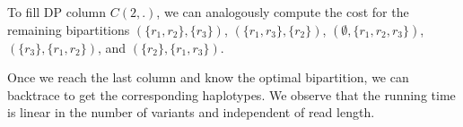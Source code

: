 To fill DP column $C(2,.)$, we can analogously compute the cost for the remaining bipartitions $(\{r_1,r_2\},\{r_3\})$,
$(\{r_1,r_3\},\{r_2\})$, $(\emptyset,\{r_1,r_2,r_3\})$, $(\{r_3\},\{r_1,r_2\})$, and $(\{r_2\},\{r_1,r_3\})$.

Once we reach the last column and know the optimal bipartition, we can backtrace to get the corresponding haplotypes.
We observe that the running time is linear in the number of variants and independent of read length.


